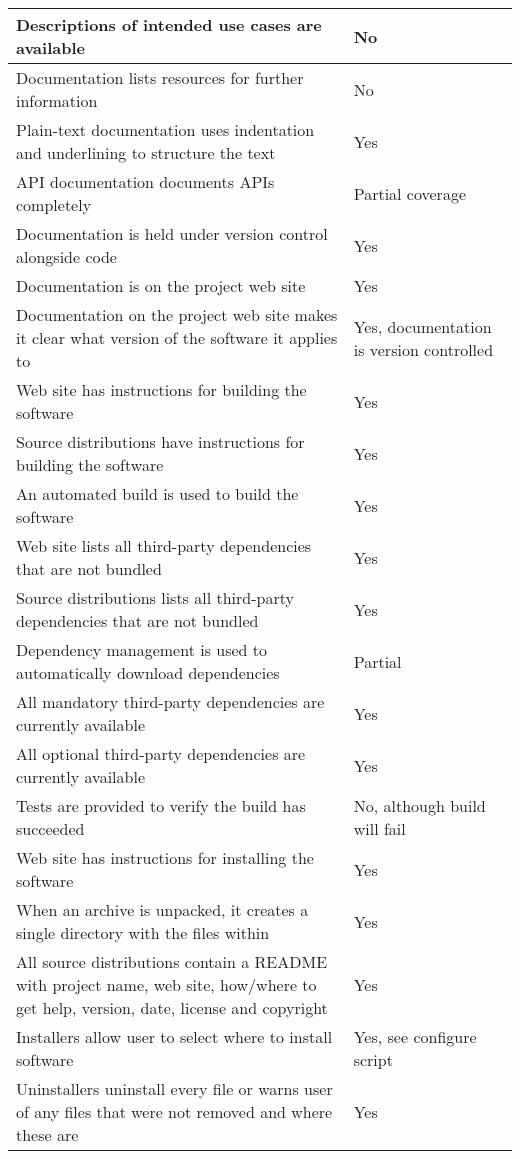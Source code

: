 \begin{center}
\begin{longtable}{ | L{11cm} | L{4cm} | }
Descriptions of intended use cases are available & No\\\hline
Documentation lists resources for further information & No\\\hline
Plain-text documentation uses indentation and underlining to structure the text & Yes\\\hline
API documentation documents APIs completely & Partial coverage\\\hline
Documentation is held under version control alongside code & Yes\\\hline
Documentation is on the project web site & Yes\\\hline
Documentation on the project web site makes it clear what version of the software it applies to & Yes, documentation is version controlled\\\hline
Web site has instructions for building the software & Yes\\\hline
Source distributions have instructions for building the software & Yes\\\hline
An automated build is used to build the software & Yes\\\hline
Web site lists all third-party dependencies that are not bundled & Yes\\\hline
Source distributions lists all third-party dependencies that are not bundled & Yes\\\hline
Dependency management is used to automatically download dependencies & Partial\\\hline
All mandatory third-party dependencies are currently available & Yes\\\hline
All optional third-party dependencies are currently available & Yes\\\hline
Tests are provided to verify the build has succeeded & No, although build will fail\\\hline
Web site has instructions for installing the software & Yes\\\hline
When an archive is unpacked, it creates a single directory with the files within & Yes\\\hline
All source distributions contain a README with project name, web site, how/where to get help, version, date, license and copyright & Yes\\\hline
Installers allow user to select where to install software & Yes, see configure script\\\hline
Uninstallers uninstall every file or warns user of any files that were not removed and where these are & Yes\\\hline

\end{longtable}
\end{center}
